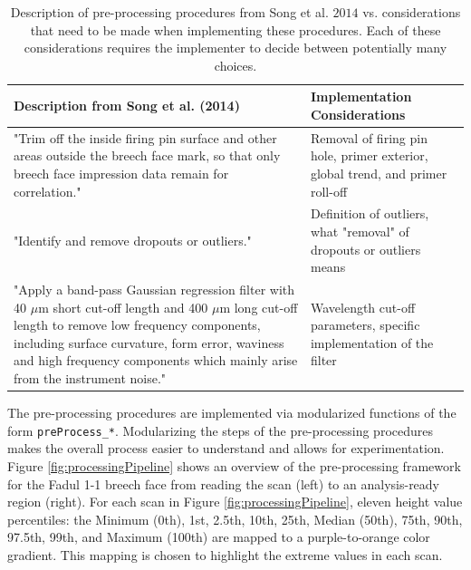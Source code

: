\documentclass[11pt,]{isuthesis}
\begin{document}
\renewcommand{\arraystretch}{2}

\begin{table}

\caption{\label{tab:pre-processTable}Description of pre-processing procedures from Song et al. \(2014\) vs. considerations that need to be made when implementing these procedures. Each of these considerations requires the implementer to decide between potentially many choices.}
\centering
\begin{tabu} to 
\toprule
\textbf{Description from Song et al. (2014)} & \textbf{Implementation Considerations}\\
\midrule
"Trim off the inside firing pin surface and other areas outside the breech face mark, so that only breech face impression data remain for correlation." & Removal of firing pin hole, primer exterior, global trend, and primer roll-off\\
"Identify and remove dropouts or outliers." & Definition of outliers, what "removal" of dropouts or outliers means\\
"Apply a band-pass Gaussian regression filter with 40 $\mu$m short cut-off length and 400 $\mu$m long cut-off length to remove low frequency components, including surface curvature, form error, waviness and high frequency components which mainly arise from the instrument noise." & Wavelength cut-off parameters, specific implementation of the filter\\
\bottomrule
\end{tabu}
\end{table}

The pre-processing procedures are implemented via modularized functions of the form \texttt{preProcess\_*}.
Modularizing the steps of the pre-processing procedures makes the overall process easier to understand and allows for experimentation.
Figure \ref{fig:processingPipeline} shows an overview of the pre-processing framework for the Fadul 1-1 breech face from reading the scan (left) to an analysis-ready region (right).
For each scan in Figure \ref{fig:processingPipeline}, eleven height value percentiles: the Minimum (0th), 1st, 2.5th, 10th, 25th, Median (50th), 75th, 90th, 97.5th, 99th, and Maximum (100th) are mapped to a purple-to-orange color gradient.
This mapping is chosen to highlight the extreme values in each scan.
\end{document}
